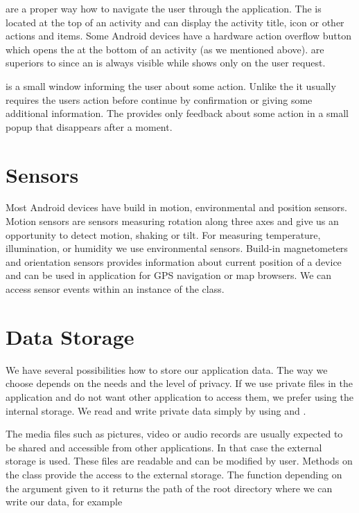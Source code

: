  are a proper way how to navigate the user through the application.
The  is located at the top of an activity and can display the activity title, icon or other actions and items.
Some Android devices have a hardware action overflow button which opens the  at the bottom of an activity (as we mentioned above).
 are superiors to  since an  is always visible while  shows only on the user request.

 is a small window informing the user about some action. 
Unlike the  it usually requires the users action before continue by confirmation or giving some additional information.
The  provides only feedback about some action in a small popup that disappears after a moment.


\section{Sensors}

Most Android devices have build in motion, environmental and position sensors.
Motion sensors are sensors measuring rotation along three axes and give us an opportunity to detect motion, shaking or tilt.
For measuring temperature, illumination, or humidity we use environmental sensors.
Build-in magnetometers and orientation sensors provides information about current position of a device and can be used in application for GPS navigation or map browsers.
We can access sensor events within an instance of  the  class.

\section{Data Storage}

We have several possibilities how to store our application data.
The way we choose depends on the needs and the level of privacy.
If we use private files in the application and do not want other application to access them, we prefer using the internal storage.
We read and write private data simply by using  and .

The media files such as pictures, video or audio records are usually expected to be shared and accessible from other applications.
In that case the external storage is used.
These files are readable and can be modified by user.
Methods on the  class provide the access to the external storage.
The function  depending on the argument given to it returns the path of the root directory where we can write our data, for example


